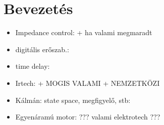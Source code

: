 \chapter{Bevezetés}

\begin{itemize}
    \item Impedance control: \cite{hogan1984Impedance,hogan1985ImpedancePART1,hogan1985ImpedancePART2,hogan1985ImpedancePART3} + ha valami megmaradt
    
    \item digitális erőszab.: \cite{kovacs2003dynamics,stepan2001vibrations} 
    
    \item time delay: \cite{stepan1989retarded}
    
    \item Irtech: 
    \cite{lantos2016iranyitasi1,lantos2016iranyitasi2,lantos2017iranyitasi3}
    + MOGIS VALAMI + NEMZETKÖZI
    
    \item Kálmán: state space, megfigyelő, stb: \cite{kalman1960new,kalman1963controllability,kalman1963mathematical,kalman1960contributions}
    
    \item Egyenáramú motor: ??? valami elektrotech ???
    
\end{itemize}
